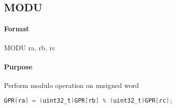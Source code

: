 \subsection{MODU}


\paragraph{Format} MODU ra, rb, rc

\paragraph{Purpose} Perform modulo operation on unsigned word


\begin{lstlisting}[language=C]
    GPR[ra] = (uint32_t)GPR[rb] % (uint32_t)GPR[rc];
\end{lstlisting}
